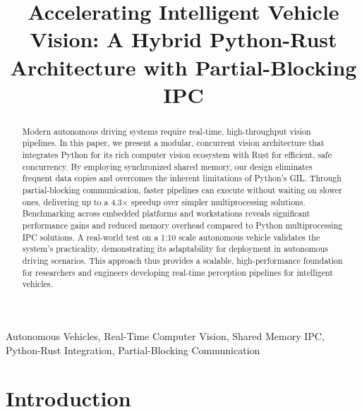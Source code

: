 \documentclass[conference]{IEEEtran}
\begin{document}
\title{
Accelerating Intelligent Vehicle Vision: A Hybrid Python-Rust Architecture with Partial-Blocking IPC
}

\author{
}

\maketitle

\begin{abstract}

Modern autonomous driving systems require real-time, high-throughput vision pipelines.
In this paper, we present a modular, concurrent vision architecture that integrates Python for its rich computer vision ecosystem with Rust for efficient, safe concurrency.
By employing synchronized shared memory, our design eliminates frequent data copies and overcomes the inherent limitations of Python’s GIL\@.
Through partial-blocking communication, faster pipelines can execute without waiting on slower ones, delivering up to a 4.3× speedup over simpler multiprocessing solutions.
Benchmarking across embedded platforms and workstations reveals significant performance gains and reduced memory overhead compared to Python multiprocessing IPC solutions.
A real-world test on a 1:10 scale autonomous vehicle validates the system’s practicality, demonstrating its adaptability for deployment in autonomous driving scenarios.
This approach thus provides a scalable, high-performance foundation for researchers and engineers developing real-time perception pipelines for intelligent vehicles.

\end{abstract}

\begin{IEEEkeywords}
Autonomous Vehicles, Real-Time Computer Vision, Shared Memory IPC, Python-Rust Integration, Partial-Blocking Communication
\end{IEEEkeywords}

\section{Introduction}
\end{document}
